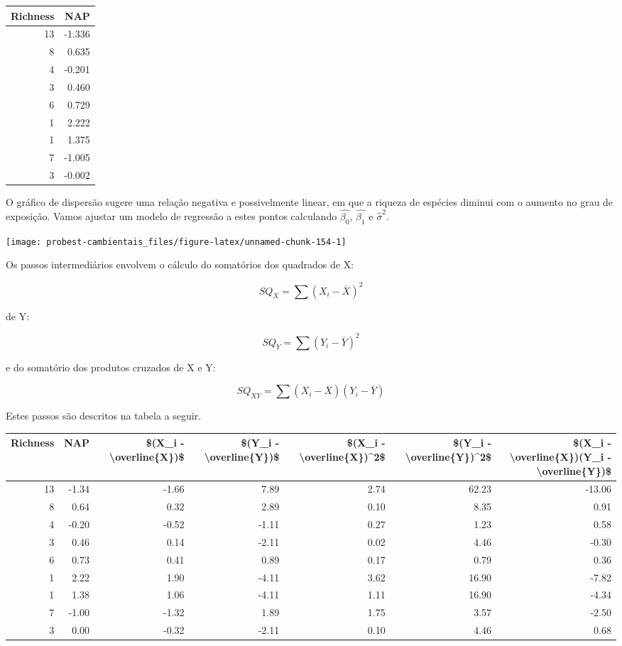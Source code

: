 \documentclass[
]{book}
\begin{document}
\begin{tabular}{r|r}
\hline
Richness & NAP\\
\hline
13 & -1.336\\
\hline
8 & 0.635\\
\hline
4 & -0.201\\
\hline
3 & 0.460\\
\hline
6 & 0.729\\
\hline
1 & 2.222\\
\hline
1 & 1.375\\
\hline
7 & -1.005\\
\hline
3 & -0.002\\
\hline
\end{tabular}

O gráfico de dispersão sugere uma relação negativa e possivelmente linear, em que a riqueza de espécies diminui com o aumento no grau de exposição. Vamos ajustar um modelo de regressão a estes pontos calculando \(\hat{\beta_0}\), \(\hat{\beta_1}\) e \(\hat{\sigma}^2\).

\begin{center}\texttt{[image: probest-cambientais\_files/figure-latex/unnamed-chunk-154-1]} \end{center}

Os passos intermediários envolvem o cálculo do somatórios dos quadrados de X:

\[SQ_X = \sum{(X_i - \overline{X})^2}\]

de Y:

\[SQ_Y = \sum{(Y_i - \overline{Y})^2}\]

e do somatório dos produtos cruzados de X e Y:

\[SQ_{XY} = \sum{(X_i - \overline{X}) (Y_i - \overline{Y})}\]

Estes passos são descritos na tabela a seguir.

\begin{tabular}{r|r|r|r|r|r|r}
\hline
Richness & NAP & \$(X\_i - \textbackslash{}overline\{X\})\$ & \$(Y\_i - \textbackslash{}overline\{Y\})\$ & \$(X\_i - \textbackslash{}overline\{X\})\textasciicircum{}2\$ & \$(Y\_i - \textbackslash{}overline\{Y\})\textasciicircum{}2\$ & \$(X\_i - \textbackslash{}overline\{X\})(Y\_i - \textbackslash{}overline\{Y\})\$\\
\hline
13 & -1.34 & -1.66 & 7.89 & 2.74 & 62.23 & -13.06\\
\hline
8 & 0.64 & 0.32 & 2.89 & 0.10 & 8.35 & 0.91\\
\hline
4 & -0.20 & -0.52 & -1.11 & 0.27 & 1.23 & 0.58\\
\hline
3 & 0.46 & 0.14 & -2.11 & 0.02 & 4.46 & -0.30\\
\hline
6 & 0.73 & 0.41 & 0.89 & 0.17 & 0.79 & 0.36\\
\hline
1 & 2.22 & 1.90 & -4.11 & 3.62 & 16.90 & -7.82\\
\hline
1 & 1.38 & 1.06 & -4.11 & 1.11 & 16.90 & -4.34\\
\hline
7 & -1.00 & -1.32 & 1.89 & 1.75 & 3.57 & -2.50\\
\hline
3 & 0.00 & -0.32 & -2.11 & 0.10 & 4.46 & 0.68\\
\hline
\end{tabular}
\end{document}
